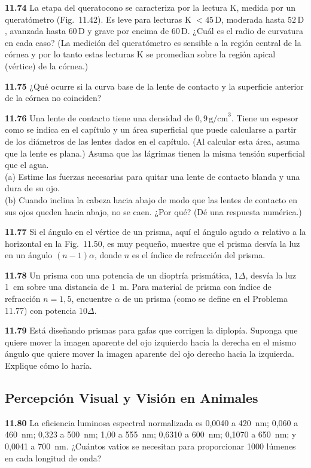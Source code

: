\documentclass[12pt]{book}
\begin{document}
\textbf{11.74} La etapa del queratocono se caracteriza por la lectura K, medida por un queratómetro (Fig.~11.42). Es leve para lecturas K $<45\,\text{D}$, moderada hasta $52\,\text{D}$, avanzada hasta $60\,\text{D}$ y grave por encima de $60\,\text{D}$. ¿Cuál es el radio de curvatura en cada caso? (La medición del queratómetro es sensible a la región central de la córnea y por lo tanto estas lecturas K se promedian sobre la región apical (vértice) de la córnea.)

\textbf{11.75} ¿Qué ocurre si la curva base de la lente de contacto y la superficie anterior de la córnea no coinciden?

\textbf{11.76} Una lente de contacto tiene una densidad de $0{,}9\,\text{g/cm}^3$. Tiene un espesor como se indica en el capítulo y un área superficial que puede calcularse a partir de los diámetros de las lentes dados en el capítulo. (Al calcular esta área, asuma que la lente es plana.) Asuma que las lágrimas tienen la misma tensión superficial que el agua.\\
(a) Estime las fuerzas necesarias para quitar una lente de contacto blanda y una dura de su ojo.\\
(b) Cuando inclina la cabeza hacia abajo de modo que las lentes de contacto en sus ojos queden hacia abajo, no se caen. ¿Por qué? (Dé una respuesta numérica.)

\textbf{11.77} Si el ángulo en el vértice de un prisma, aquí el ángulo agudo $\alpha$ relativo a la horizontal en la Fig.~11.50, es muy pequeño, muestre que el prisma desvía la luz en un ángulo $(n-1)\alpha$, donde $n$ es el índice de refracción del prisma.

\textbf{11.78} Un prisma con una potencia de un dioptría prismática, $1\Delta$, desvía la luz 1~cm sobre una distancia de 1~m. Para material de prisma con índice de refracción $n = 1{,}5$, encuentre $\alpha$ de un prisma (como se define en el Problema 11.77) con potencia $10\Delta$.

\textbf{11.79} Está diseñando prismas para gafas que corrigen la diplopía. Suponga que quiere mover la imagen aparente del ojo izquierdo hacia la derecha en el mismo ángulo que quiere mover la imagen aparente del ojo derecho hacia la izquierda. Explique cómo lo haría.

\subsection*{Percepción Visual y Visión en Animales}

\textbf{11.80} La eficiencia luminosa espectral normalizada es 0,0040 a 420~nm; 0,060 a 460~nm; 0,323 a 500~nm; 1,00 a 555~nm; 0,6310 a 600~nm; 0,1070 a 650~nm; y 0,0041 a 700~nm. ¿Cuántos vatios se necesitan para proporcionar 1000 lúmenes en cada longitud de onda?
\end{document}
